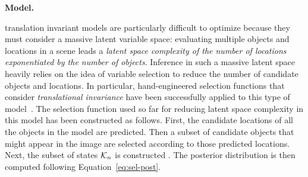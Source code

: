 \textbf{Model.}
%

 translation invariant models are particularly difficult to optimize because they must consider a massive latent variable space: evaluating multiple objects and locations in a scene leads a \textit{latent space complexity of the number of locations exponentiated by the number of objects}.
Inference in such a massive latent space heavily relies on the idea of variable selection to reduce the number of candidate objects and locations. In particular, hand-engineered selection functions that consider \emph{translational invariance} have been successfully applied to this type of model~\citep{DaiLucke2012b,DaiLucke2014,DaiEtAl2013}.
%
The selection function used so far for reducing latent space complexity in this model has been constructed as follows.
First, the candidate locations of all the objects in the model are predicted.
Then a subset of candidate objects that might appear in the image are selected according to those predicted locations.  
Next, the subset of states $\mathcal{K}_{n}$ is constructed 
.
The posterior distribution is then computed following Equation~\eqref{eq:sel-post}.


